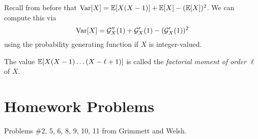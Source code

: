 \begin{remark}
  Recall from before that
  $\operatorname{Var}[X] = \mathbb{E}[X(X - 1)] + \mathbb{E}[X] - (\mathbb{E}[X])^2$.
  We can compute this via
  \[
    \operatorname{Var}[X] = \mathcal{G}_X''(1) + \mathcal{G}_X'(1) - (\mathcal{G}_X'(1))^2
  \]
  using the probability generating function if
  $X$ is integer-valued.
\end{remark}

\begin{remark}
  The value $\mathbb{E}[X(X - 1) \dots (X - \ell + 1)]$
  is called the \emph{factorial moment of order $\ell$} of $X$.
\end{remark}

\section{Homework Problems}
Problems \#2, 5, 6, 8, 9, 10, 11 from Grimmett and
Welsh.
